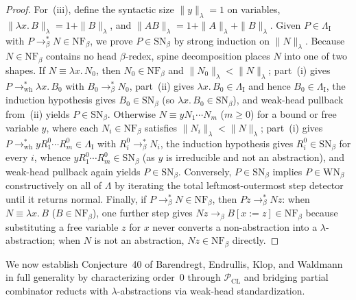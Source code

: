 \documentclass[11pt,reqno]{amsart}
\numberwithin{equation}{section}
\theoremstyle{plain}
\theoremstyle{definition}
\theoremstyle{remark}
\newcommand{\NF}{\mathrm{NF}}
\newcommand{\SN}{\mathrm{SN}}
\newcommand{\WN}{\mathrm{WN}}
\begin{document}
\begin{proof}
For~(iii), define the syntactic size $\|y\|_\lambda = 1$ on variables, $\|\lambda x.\, B\|_\lambda = 1 + \|B\|_\lambda$, and $\|A B\|_\lambda = 1 + \|A\|_\lambda + \|B\|_\lambda$. Given $P \in \Lambda_{\mathrm{I}}$ with $P \to_\beta^* N \in \NF_\beta$, we prove $P \in \SN_\beta$ by strong induction on $\|N\|_\lambda$. Because $N \in \NF_\beta$ contains no head $\beta$-redex, spine decomposition places $N$ into one of two shapes. If $N \equiv \lambda x.\, N_0$, then $N_0 \in \NF_\beta$ and $\|N_0\|_\lambda < \|N\|_\lambda$; part~(i) gives $P \to_{\mathrm{wh}}^* \lambda x.\, B_0$ with $B_0 \to_\beta^* N_0$, part~(ii) gives $\lambda x.\, B_0 \in \Lambda_{\mathrm{I}}$ and hence $B_0 \in \Lambda_{\mathrm{I}}$, the induction hypothesis gives $B_0 \in \SN_\beta$ (so $\lambda x.\, B_0 \in \SN_\beta$), and weak-head pullback from~(ii) yields $P \in \SN_\beta$. Otherwise $N \equiv y N_1 \cdots N_m$ ($m \ge 0$) for a bound or free variable $y$, where each $N_i \in \NF_\beta$ satisfies $\|N_i\|_\lambda < \|N\|_\lambda$; part~(i) gives $P \to_{\mathrm{wh}}^* y R_1^0 \cdots R_m^0 \in \Lambda_{\mathrm{I}}$ with $R_i^0 \to_\beta^* N_i$, the induction hypothesis gives $R_i^0 \in \SN_\beta$ for every $i$, whence $y R_1^0 \cdots R_m^0 \in \SN_\beta$ (as $y$ is irreducible and not an abstraction), and weak-head pullback again yields $P \in \SN_\beta$. Conversely, $P \in \SN_\beta$ implies $P \in \WN_\beta$ constructively on all of $\Lambda$ by iterating the total leftmost-outermost step detector until it returns normal. Finally, if $P \to_\beta^* N \in \NF_\beta$, then $P z \to_\beta^* N z$: when $N \equiv \lambda x.\, B$ ($B \in \NF_\beta$), one further step gives $N z \to_\beta B[x := z] \in \NF_\beta$ because substituting a free variable $z$ for $x$ never converts a non-abstraction into a $\lambda$-abstraction; when $N$ is not an abstraction, $N z \in \NF_\beta$ directly.
\end{proof}

We now establish Conjecture~40 of Barendregt, Endrullis, Klop, and Waldmann \cite[p.~102]{BarendregtEndrullisKlopWaldmann2017} in full generality by characterizing order~$0$ through $\mathcal{P}_{\mathrm{CL}}$ and bridging partial combinator reducts with $\lambda$-abstractions via weak-head standardization.
\end{document}
